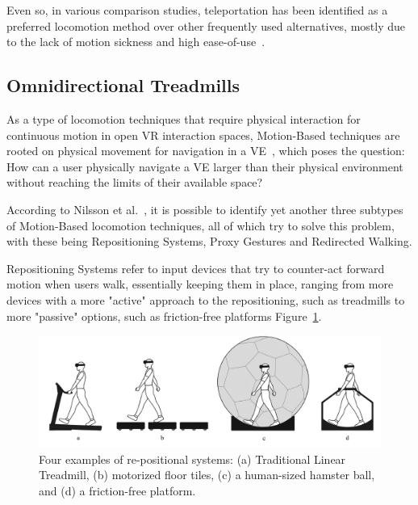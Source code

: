 Even so, in various comparison studies, teleportation has been identified as a preferred locomotion method over other frequently used 
alternatives, mostly due to the lack of motion sickness and high ease-of-use~\cite{Boletsis2019, Langbehn2018}.

\subsection{Omnidirectional Treadmills}
\label{sec:omni-directional-treadmills}

As a type of locomotion techniques that require physical interaction for continuous motion in open \gls{VR} interaction spaces, 
Motion-Based techniques are rooted on physical movement for navigation in a \gls{VE}~\cite{Boletsis2017}, which poses the
question: How can a user physically navigate a \gls{VE} larger than their physical environment without reaching the limits 
of their available space?

According to Nilsson et al.~\cite{Nilsson2018}, it is possible to identify yet another three subtypes of Motion-Based 
locomotion techniques, all of which try to solve this problem, with these being Repositioning Systems, Proxy Gestures and 
Redirected Walking.

Repositioning Systems refer to input devices that try to counter-act forward motion when users walk, essentially keeping them in place, 
ranging from more devices with a more "active" approach to the repositioning, such as treadmills to more "passive" options, such as friction-free
platforms Figure~\ref{fig:repo-systems}.

\begin{figure}[b]
    \centering
    \includegraphics[width=\textwidth]{NOVAthesisFiles/Images/papers/repo-systems.png}
    \caption[Common Re-Positional Systems]{Four examples of re-positional systems: (a) Traditional Linear Treadmill, (b) motorized floor tiles,
    (c) a human-sized hamster ball, and (d) a friction-free platform.~\cite{Nilsson2018}}
    \label{fig:repo-systems}
\end{figure}


